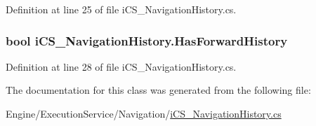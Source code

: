 Definition at line 25 of file i\+C\+S\+\_\+\+Navigation\+History.\+cs.

\hypertarget{classi_c_s___navigation_history_ac5a56449c385b8effd80741ac728ef19}{
\subsubsection[{Has\+Forward\+History}]{\setlength{\rightskip}{0pt plus 5cm}bool i\+C\+S\+\_\+\+Navigation\+History.\+Has\+Forward\+History\hspace{0.3cm}{\ttfamily [get]}}}\label{classi_c_s___navigation_history_ac5a56449c385b8effd80741ac728ef19}


Definition at line 28 of file i\+C\+S\+\_\+\+Navigation\+History.\+cs.



The documentation for this class was generated from the following file\+:\begin{DoxyCompactItemize}
\item 
Engine/\+Execution\+Service/\+Navigation/\hyperlink{i_c_s___navigation_history_8cs}{i\+C\+S\+\_\+\+Navigation\+History.\+cs}\end{DoxyCompactItemize}
